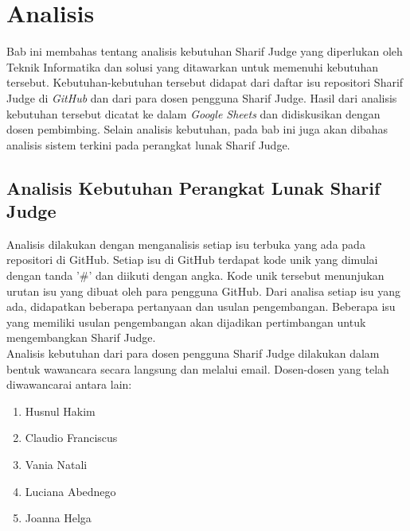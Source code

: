 \chapter{Analisis}
\label{chap:analisis}

Bab ini membahas tentang analisis kebutuhan Sharif Judge yang diperlukan oleh Teknik Informatika dan solusi yang ditawarkan untuk memenuhi kebutuhan tersebut. Kebutuhan-kebutuhan tersebut didapat dari daftar isu repositori Sharif Judge di \textit{GitHub} dan dari para dosen pengguna Sharif Judge. Hasil dari analisis kebutuhan tersebut dicatat ke dalam \textit{Google Sheets} dan didiskusikan dengan dosen pembimbing. Selain analisis kebutuhan, pada bab ini juga akan dibahas analisis sistem terkini pada perangkat lunak Sharif Judge.


\section{Analisis Kebutuhan Perangkat Lunak Sharif Judge}
\label{sec:analisis}
Analisis dilakukan dengan menganalisis setiap isu terbuka yang ada pada repositori di GitHub. Setiap isu di GitHub terdapat kode unik yang dimulai dengan tanda '\#' dan diikuti dengan angka. Kode unik tersebut menunjukan urutan isu yang dibuat oleh para pengguna GitHub. Dari analisa setiap isu yang ada, didapatkan beberapa pertanyaan dan usulan pengembangan. Beberapa isu yang memiliki usulan pengembangan akan dijadikan pertimbangan untuk mengembangkan Sharif Judge. \\

Analisis kebutuhan dari para dosen pengguna Sharif Judge dilakukan dalam bentuk wawancara secara langsung dan melalui email. Dosen-dosen yang telah diwawancarai antara lain:
\begin{enumerate}
	\item Husnul Hakim
	\item Claudio Franciscus
	\item Vania Natali
	\item Luciana Abednego
	\item Joanna Helga
\end{enumerate}

